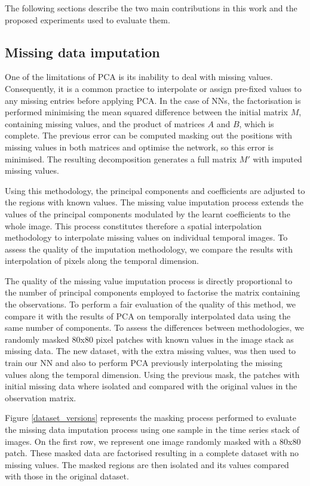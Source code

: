 \documentclass[essd, manuscript]{copernicus}
\begin{document}
The following sections describe the two main contributions in this work and the proposed experiments used to evaluate them.

\subsection{Missing data imputation}

One of the limitations of PCA is its inability to deal with missing values. Consequently, it is a common practice to interpolate or assign pre-fixed values to any missing entries before applying PCA. In the case of NNs, the factorisation is performed minimising the mean squared difference between the initial matrix $M$, containing missing values, and the product of matrices $A$ and $B$, which is complete. The previous error can be computed masking out the positions with missing values in both matrices and optimise the network, so this error is minimised. The resulting decomposition generates a full matrix $M'$ with imputed missing values.

Using this methodology, the principal components and coefficients are adjusted to the regions with known values. The missing value imputation process extends the values of the principal components modulated by the learnt coefficients to the whole image. This process constitutes therefore a spatial interpolation methodology to interpolate missing values on individual temporal images. To assess the quality of the imputation methodology, we compare the results with interpolation of pixels along the temporal dimension.

The quality of the missing value imputation process is directly proportional to the number of principal components employed to factorise the matrix containing the observations. To perform a fair evaluation of the quality of this method, we compare it with the results of PCA on temporally interpolated data using the same number of components. To assess the differences between methodologies, we randomly masked 80x80 pixel patches with known values in the image stack as missing data. The new dataset, with the extra missing values, was then used to train our NN and also to perform PCA previously interpolating the missing values along the temporal dimension. Using the previous mask, the patches with initial missing data where isolated and compared with the original values in the observation matrix. 

Figure \ref{dataset_versions} represents the masking process performed to evaluate the missing data imputation process using one sample in the time series stack of images. On the first row, we represent one image randomly masked with a 80x80 patch. These masked data are factorised resulting in a complete dataset with no missing values. The masked regions are then isolated and its values compared with those in the original dataset.
\end{document}
